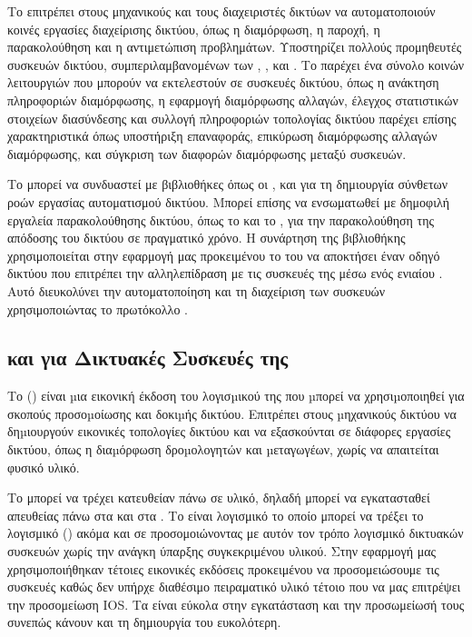 Το  επιτρέπει στους μηχανικούς και τους διαχειριστές δικτύων να αυτοματοποιούν κοινές εργασίες διαχείρισης δικτύου, όπως η διαμόρφωση, η παροχή, η παρακολούθηση και η 
αντιμετώπιση προβλημάτων. Υποστηρίζει πολλούς προμηθευτές συσκευών δικτύου, συμπεριλαμβανομένων των , ,  και .
Το  παρέχει ένα σύνολο κοινών λειτουργιών που μπορούν να εκτελεστούν σε συσκευές δικτύου, όπως η ανάκτηση πληροφοριών διαμόρφωσης, η εφαρμογή διαμόρφωσης 
αλλαγών, έλεγχος στατιστικών στοιχείων διασύνδεσης και συλλογή πληροφοριών τοπολογίας δικτύου παρέχει επίσης χαρακτηριστικά όπως υποστήριξη επαναφοράς, επικύρωση διαμόρφωσης 
αλλαγών διαμόρφωσης, και σύγκριση των διαφορών διαμόρφωσης μεταξύ συσκευών.


Το  μπορεί να συνδυαστεί με βιβλιοθήκες  όπως οι ,  και  για τη δημιουργία σύνθετων ροών εργασίας αυτοματισμού δικτύου. Μπορεί επίσης να ενσωματωθεί με δημοφιλή εργαλεία παρακολούθησης δικτύου, όπως το  και το , για την παρακολούθηση της απόδοσης του δικτύου σε πραγματικό χρόνο. Η συνάρτηση  της βιβλιοθήκης  χρησιμοποιείται στην εφαρμογή μας  προκειμένου το   του   να αποκτήσει έναν οδηγό δικτύου που επιτρέπει την αλληλεπίδραση με τις συσκευές της  μέσω ενός ενιαίου . Αυτό διευκολύνει την αυτοματοποίηση και τη διαχείριση των συσκευών χρησιμοποιώντας το πρωτόκολλο .


\subsection{ και  για Δικτυακές Συσκευές της   }

Το  () είναι µια εικονική έκδοση του λογισµικού  της  που µπορεί να χρησιµοποιηθεί για σκοπούς προσοµοίωσης και δοκιµής δικτύου. Επιτρέπει στους µηχανικούς δικτύου να δηµιουργούν εικονικές τοπολογίες δικτύου και να εξασκούνται σε διάφορες εργασίες δικτύου, όπως η διαµόρφωση δροµολογητών και µεταγωγέων, χωρίς να απαιτείται φυσικό υλικό. 


Το  μπορεί να τρέχει κατευθείαν πάνω σε υλικό, δηλαδή μπορεί να εγκατασταθεί απευθείας πάνω στα  και στα  . Το  είναι λογισμικό το οποίο μπορεί να τρέξει το λογισμικό () ακόμα και σε  προσομοιώνοντας με αυτόν τον τρόπο λογισμικό δικτυακών συσκευών χωρίς την ανάγκη ύπαρξης συγκεκριμένου υλικού. Στην εφαρμογή μας χρησιμοποιήθηκαν τέτοιες εικονικές εκδόσεις προκειμένου να προσομειώσουμε τις  συσκευές καθώς δεν υπήρχε διαθέσιμο πειραματικό υλικό τέτοιο που να μας επιτρέψει την προσομείωση IOS. Τα  είναι εύκολα στην εγκατάσταση και την προσωμείωσή τους συνεπώς κάνουν και τη δημιουργία του  ευκολότερη.

